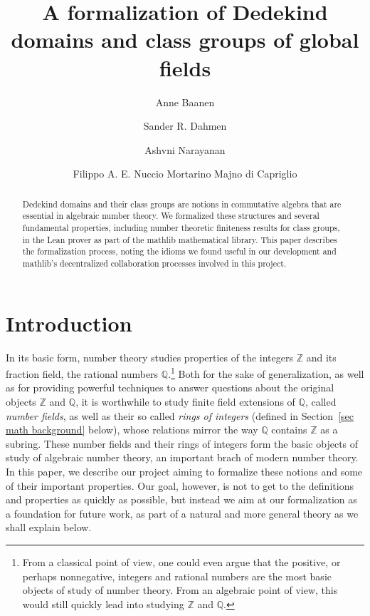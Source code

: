 \documentclass[a4paper,USenglish,cleveref, autoref, thm-restate]{lipics-v2021}
\title{A formalization of Dedekind domains and class groups of global fields}
\author{Anne Baanen}{Vrije Universiteit Amsterdam, Netherlands \and \url{https://cs.vu.nl/~tbn305}}{t.baanen@vu.nl}{https://orcid.org/0000-0001-8497-3683}
{NWO Vidi grant No. 016.Vidi.189.037, Lean Forward}
\author{Sander R. Dahmen}{Vrije Universiteit Amsterdam, Netherlands \and \url{https://few.vu.nl/~sdn249/}}{s.r.dahmen@vu.nl}{https://orcid.org/0000-0002-0014-0789}{NWO Vidi grant No. 639.032.613, New Diophantine Directions}
\author{Ashvni Narayanan}{London School of Geometry and Number Theory}{a.narayanan20@imperial.ac.uk}{orcID?}{EPSRC, UK}
\author{Filippo A. E. Nuccio Mortarino Majno di Capriglio}{Univ Lyon, Université Jean Monnet Saint-Étienne, CNRS UMR 5208, Institut Camille Jordan\and\url {https://perso.univ-st-etienne.fr/nf51454h/index.html}}{filippo.nuccio@univ-st-etienne.fr}{https://orcid.org/0000-0002-5318-9869}{\empty}
\newcommand{\Q}{\mathbb{Q}}
\newcommand{\Z}{\mathbb{Z}}
\begin{document}
\maketitle

\begin{abstract}
Dedekind domains and their class groups are notions in commutative algebra that are essential in algebraic number theory.
We formalized these structures and several fundamental properties, including number theoretic finiteness results for class groups, in the Lean prover as part of the mathlib mathematical library.
This paper describes the formalization process,
noting the idioms we found useful in our development
and mathlib's decentralized collaboration processes involved in this project.
\end{abstract}

\section{Introduction}

In its basic form, number theory studies properties of the integers $\Z$
and its fraction field, the rational numbers $\Q$.\footnote{From a classical point of view, one could even argue that the positive, or perhaps nonnegative, integers and rational numbers are the most basic objects of study of number theory. From an algebraic point of view, this would still quickly lead into studying $\Z$ and $\Q$.}
Both for the sake of generalization, as well as for providing powerful techniques to answer questions about the original objects $\Z$ and $\Q$,
it is worthwhile to study finite field extensions of $\Q$, called \emph{number fields}, as well as their so called \emph{rings of integers} (defined in Section~\ref{sec math background} below),
whose relations mirror the way $\Q$ contains $\Z$ as a subring.
These number fields and their rings of integers form the basic objects of study of algebraic number theory, an important brach of modern number theory.
In this paper, we describe our project aiming to formalize these notions and some of their important properties.
Our goal, however, is not to get to the definitions and properties as quickly as possible,
but instead we aim at our formalization as a foundation for future work,
as part of a natural and more general theory as we shall explain below.
\end{document}

